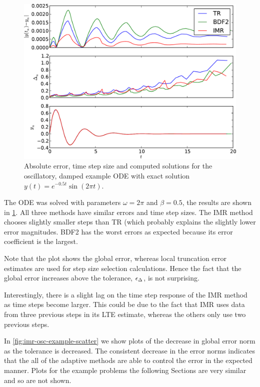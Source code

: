 \begin{figure}
  \centering \includegraphics[width=1\textwidth]{plots/aimr_odes/damped_oscillation-errornormsvs-dtsvs-tracevaluesvstimes}
  \caption{Absolute error, time step size and computed solutions for the oscillatory, damped example ODE with exact solution $y(t) = e^{-0.5t} \sin(2\pi t)$.}
  \label{fig:imr-osc-example}
\end{figure}

The ODE was solved with parameters $\omega = 2 \pi$ and $\beta = 0.5$, the results are shown in \cref{fig:imr-osc-example}.
All three methods have similar errors and time step sizes.
The IMR method chooses slightly smaller steps than TR (which probably explains the slightly lower error magnitudes.
BDF2 has the worst errors as expected because its error coefficient is the largest.

Note that the plot shows the global error, whereas local truncation error estimates are used for step size selection calculations.
Hence the fact that the global error increases above the tolerance, $\epsilon_{\Delta_{}}$, is not surprising.

Interestingly, there is a slight lag on the time step response of the IMR method as time steps become larger.
This could be due to the fact that IMR uses data from three previous steps in its LTE estimate, whereas the others only use two previous steps.

In \cref{fig:imr-osc-example-scatter} we show plots of the decrease in global error norm as the tolerance is decreased.
The consistent decrease in the error norms indicates that the all of the adaptive methods are able to control the error in the expected manner.
Plots for the example problems the following Sections are very similar and so are not shown.

